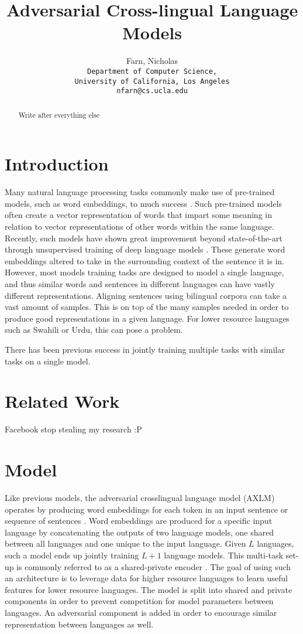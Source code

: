 \documentclass[12pt,letterpaper,twocolumn]{article}
\title{Adversarial Cross-lingual Language Models}
\author{Farn, Nicholas\\
	\texttt{Department of Computer Science,}\\
	\texttt{University of California, Los Angeles}\\
	\texttt{nfarn@cs.ucla.edu}
}
\begin{document}
\maketitle
\begin{abstract}
Write after everything else
\end{abstract}

\section{Introduction}
Many natural language processing tasks commonly make use of pre-trained models, such as word embeddings, to much success \cite{}.  Such pre-trained models often create a vector representation of words that impart some meaning in relation to vector representations of other words within the same language.  Recently, such models have shown great improvement beyond state-of-the-art through unsupervised training of deep language models \cite{bert, openai, elmo}.  These generate word embeddings altered to take in the surrounding context of the sentence it is in.  However, most models training tasks are designed to model a single language, and thus similar words and sentences in different languages can have vastly different representations.  Aligning sentences using bilingual corpora can take a vast amount of samples.  This is on top of the many samples needed in order to produce good representations in a given language.  For lower resource languages such as Swahili or Urdu, this can pose a problem.  

There has been previous success in jointly training multiple tasks with similar tasks on a single model.

\section{Related Work}
Facebook stop stealing my research :P

\section{Model}
Like previous models, the adversarial crosslingual language model (AXLM) operates by producing word embeddings for each token in an input sentence or sequence of sentences \cite{bert, openai, elmo, xlm}.  Word embeddings are produced for a specific input language by concatenating the outputs of two language models, one shared between all languages and one unique to the input language.  Given $L$ languages, such a model ends up jointly training $L+1$ language models.  This multi-task set-up is commonly referred to as a shared-private encoder \cite{Chen16}.  The goal of using such an architecture is to leverage data for higher resource languages to learn useful features for lower resource languages.  The model is split into shared and private components in order to prevent competition for model parameters between languages.  An adversarial component is added in order to encourage similar representation between languages as well.
\end{document}
